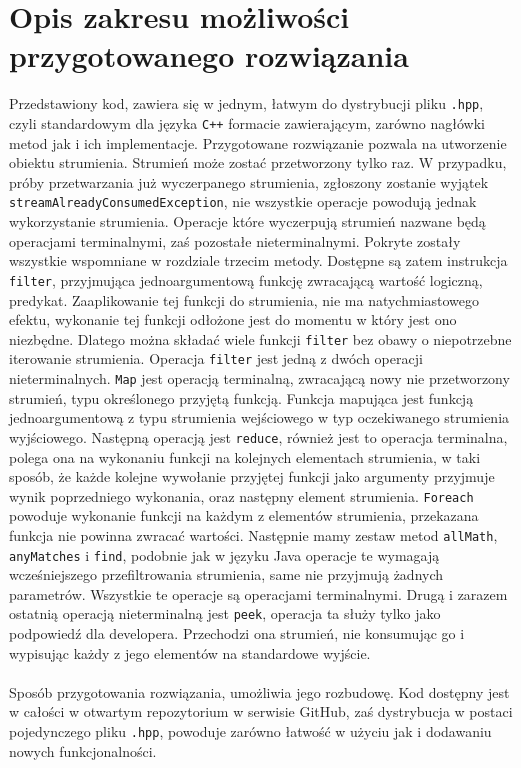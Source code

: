 \documentclass[a4paper,10pt]{report}
\begin{document}
\section{Opis zakresu możliwości przygotowanego rozwiązania}
Przedstawiony kod, zawiera się w jednym, łatwym do dystrybucji pliku \verb|.hpp|, czyli standardowym dla języka \verb|C++| formacie zawierającym, zarówno nagłówki metod jak i ich implementacje. Przygotowane rozwiązanie pozwala na utworzenie obiektu strumienia. Strumień może zostać przetworzony tylko raz. W przypadku, próby przetwarzania już wyczerpanego strumienia, zgłoszony zostanie wyjątek \verb|streamAlreadyConsumedException|, nie wszystkie operacje powodują jednak wykorzystanie strumienia. Operacje które wyczerpują strumień nazwane będą operacjami terminalnymi, zaś pozostałe nieterminalnymi. Pokryte zostały wszystkie wspomniane w rozdziale trzecim metody. Dostępne są zatem instrukcja \verb|filter|, przyjmująca jednoargumentową funkcję zwracającą wartość logiczną, predykat. Zaaplikowanie tej funkcji do strumienia, nie ma natychmiastowego efektu, wykonanie tej funkcji odłożone jest do momentu w który jest ono niezbędne. Dlatego można składać wiele funkcji \verb|filter| bez obawy o niepotrzebne iterowanie strumienia. Operacja \verb|filter| jest jedną z dwóch operacji nieterminalnych. \verb|Map| jest operacją terminalną, zwracającą nowy nie przetworzony strumień, typu określonego przyjętą funkcją. Funkcja mapująca jest funkcją jednoargumentową z typu strumienia wejściowego w typ oczekiwanego strumienia wyjściowego. Następną operacją jest \verb|reduce|, również jest to operacja terminalna, polega ona na wykonaniu funkcji na kolejnych elementach strumienia, w taki sposób, że każde kolejne wywołanie przyjętej funkcji jako argumenty przyjmuje wynik poprzedniego wykonania, oraz następny element strumienia. \verb|Foreach| powoduje wykonanie funkcji na każdym z elementów strumienia, przekazana funkcja nie powinna zwracać wartości. Następnie mamy zestaw metod \verb|allMath|, \verb|anyMatches| i \verb|find|, podobnie jak w języku Java operacje te wymagają wcześniejszego przefiltrowania strumienia, same nie przyjmują żadnych parametrów. Wszystkie te operacje są operacjami terminalnymi. Drugą i zarazem ostatnią operacją nieterminalną jest \verb|peek|, operacja ta służy tylko jako podpowiedź dla developera. Przechodzi ona strumień, nie konsumując go i wypisując każdy z jego elementów na standardowe wyjście.
\paragraph{}
Sposób przygotowania rozwiązania, umożliwia jego rozbudowę. Kod dostępny jest w całości w otwartym repozytorium w serwisie GitHub, zaś dystrybucja w postaci pojedynczego pliku \verb|.hpp|, powoduje zarówno łatwość w użyciu jak i dodawaniu nowych funkcjonalności. 
\end{document}
